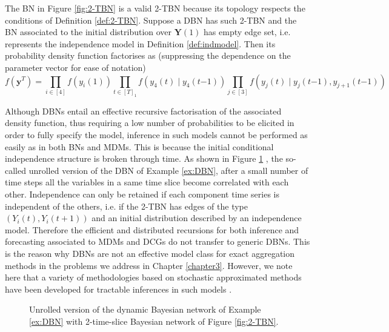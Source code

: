 \begin{example}
\label{ex:DBN}
The BN in Figure \ref{fig:2-TBN} is a valid 2-TBN because its topology respects the conditions of Definition \ref{def:2-TBN}. Suppose a DBN has such 2-TBN and the BN associated to the initial distribution over $\bm{Y}(1)$ has empty edge set, i.e. represents the independence model in Definition \ref{def:indmodel}. Then its probability density function factorises as (suppressing the dependence on the parameter vector for ease of notation)
\begin{equation*}
\label{eq:exampleDBNfactorization}
f\left(\bm{y}^T\right)=\prod_{i\in[4]}f(y_i(1))\prod_{t\in[T]_1}f(y_4(t)\;|\;y_{4}(t{-1}))\prod_{j\in[3]}f(y_j(t)\;|\;y_{j}(t{-1}),y_{j+1}(t{-1}))
\end{equation*}
\end{example}

Although DBNs entail an effective recursive factorisation of the associated density function, thus requiring a low number of probabilities to be elicited in order to fully specify the model, inference in such models cannot be performed as easily as in both BNs and MDMs. This is because the initial conditional independence structure is broken through time. As shown in Figure \ref{fig:unrolled} \citep[from ][]{Boyen1998}, the so-called unrolled version of the DBN of Example \ref{ex:DBN}, after a small number of time steps all the variables in a same time slice become correlated with each other. Independence can only be retained if each component time series is independent of the others, i.e. if the 2-TBN has edges of the type $(Y_i(t),Y_i(t+1))$ and an initial distribution described by an independence model. Therefore the efficient and distributed recursions for both inference and forecasting associated to MDMs and DCGs do not transfer to generic DBNs. This is the reason why DBNs are not an effective model class for exact aggregation methods in the problems we address in Chapter \ref{chapter3}. However, we note here that a variety of methodologies based on stochastic approximated methods have been developed for tractable inferences in such models \citep{Boyen1998, Koller2001}. 

\begin{figure}
\vspace{-.3cm}
\centerline{
}
\caption{Unrolled version of the dynamic Bayesian network of Example \ref{ex:DBN} with 2-time-slice Bayesian network of Figure \ref{fig:2-TBN}.\label{fig:unrolled}}
\end{figure}


